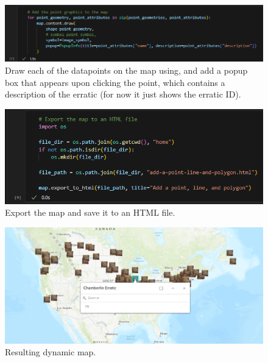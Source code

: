 \documentclass{article}
\begin{document}

\begin{figure}[H]
    \centering
    \includegraphics[width=1.0\textwidth]{Images/CodeSnippet7.png}
    \caption{Draw each of the datapoints on the map using, and add a popup box that appears upon clicking the point, which contains a description of the erratic (for now it just shows the erratic ID).}
    \label{fig:7}
\end{figure}

\begin{figure}[H]
    \centering
    \includegraphics[width=1.0\textwidth]{Images/CodeSnippet9.png}
    \caption{Export the map and save it to an HTML file.}
    \label{fig:9}
\end{figure}

\begin{figure}[H]
    \centering
    \includegraphics[width=1.0\textwidth]{Images/DigitizedMap.png}
    \caption{Resulting dynamic map.}
    \label{fig:10}
\end{figure}
\end{document}
